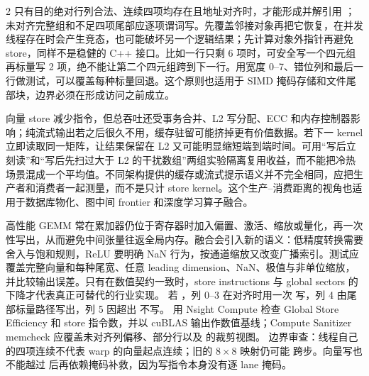 \begin{solutionexercise}{2}
只有目的绝对行列合法、连续四项均存在且地址对齐时，才能形成并解引用 ；未对齐完整组和不足四项尾部应逐项谓词写。先覆盖邻接对象再把它恢复，在并发线程存在时会产生竞态，也可能破坏另一个逻辑结果；先计算对象外指针再避免 store，同样不是稳健的 C++ 接口。比如一行只剩 6 项时，可安全写一个四元组再标量写 2 项，绝不能让第二个四元组跨到下一行。用宽度 0--7、错位列和最后一行做测试，可以覆盖每种标量回退。这个原则也适用于 SIMD 掩码存储和文件尾部块，边界必须在形成访问之前成立。

向量 store 减少指令，但总吞吐还受事务合并、L2 写分配、ECC 和内存控制器影响；纯流式输出若之后很久不用，缓存驻留可能挤掉更有价值数据。若下一 kernel 立即读取同一矩阵，让结果保留在 L2 又可能明显缩短端到端时间。可用“写后立刻读”和“写后先扫过大于 L2 的干扰数组”两组实验隔离复用收益，而不能把冷热场景混成一个平均值。不同架构提供的缓存或流式提示语义并不完全相同，应把生产者和消费者一起测量，而不是只计 store kernel。这个生产--消费距离的视角也适用于数据库物化、图中间 frontier 和深度学习算子融合。

高性能 GEMM 常在累加器仍位于寄存器时加入偏置、激活、缩放或量化，再一次性写出，从而避免中间张量往返全局内存。融合会引入新的语义：低精度转换需要舍入与饱和规则，ReLU 要明确 NaN 行为，按通道缩放又改变广播索引。测试应覆盖完整向量和每种尾宽、任意 leading dimension、NaN、极值与非单位缩放，并比较输出误差。只有在数值契约一致时，store instructions 与 global sectors 的下降才代表真正可替代的行业实现。
\variantheading 若 ，列 0--3 在对齐时用一次  写，列 4
由尾部标量路径写出，列 5 因超出  不写。
\practiceheading 用 Nsight Compute 检查 Global Store Efficiency 和 store 指令数，并以
cuBLAS 输出作数值基线；Compute Sanitizer memcheck 应覆盖未对齐列偏移、部分行以及
 的裁剪视图。
边界审查：线程自己的四项连续不代表 warp 的向量起点连续；旧的 $8\times8$ 映射仍可能
跨步。向量写也不能越过  后再依赖掩码补救，因为写指令本身没有逐 lane 掩码。
\end{solutionexercise}

